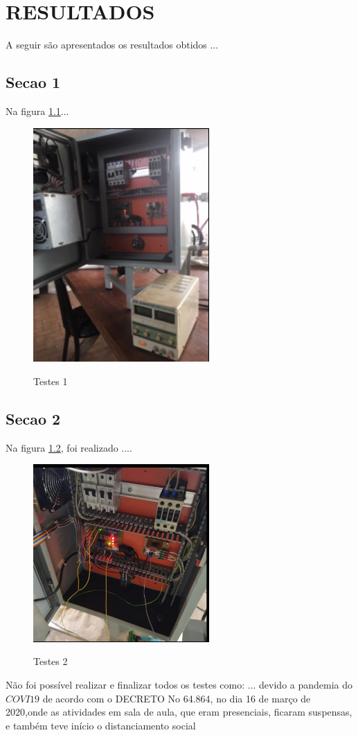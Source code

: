 
\chapter{RESULTADOS}

A seguir são apresentados os resultados obtidos ...

\section{Secao 1}
\label{sec:Secao_1}
Na figura \ref{fig:figura50}...

\begin{figure}[H]
    \centering
    \caption{Testes 1}
    \includegraphics[width=0.6\textwidth]{figuras/figu50.png}
    \label{fig:figura50}
\end{figure}

\section{Secao 2}
\label{sec:Secao_2}

Na figura \ref{fig:figura44}, foi realizado ....

\begin{figure}[H]
    \centering
    \caption{Testes 2}
    \includegraphics[width=0.6\textwidth]{figuras/figu44.png}
    \label{fig:figura44}
\end{figure}

Não foi possível realizar e finalizar todos os testes como: ... devido a pandemia do $COVI19$ de acordo com o DECRETO No 64.864, no dia 16 de março de 2020,onde as atividades em sala de aula, que eram presenciais, ficaram suspensas, e também teve início o distanciamento social
